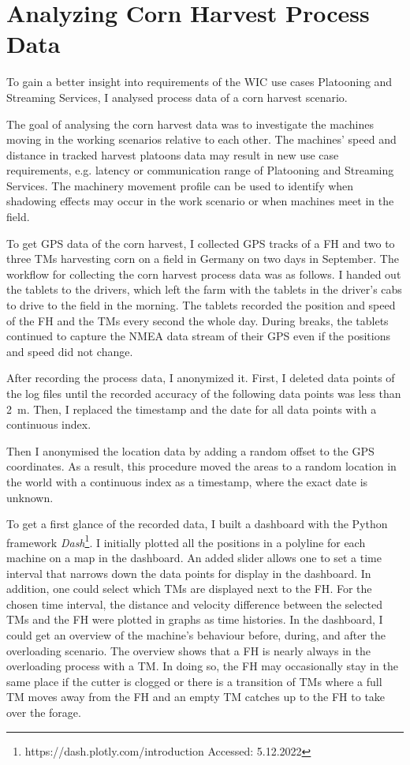 \chapter{Analyzing Corn Harvest Process Data}
\label{chap:cornHarvestData}
To gain a better insight into requirements of the \ac{WIC} use cases Platooning and Streaming Services, I analysed process data of a corn harvest scenario.

The goal of analysing the corn harvest data was to investigate the machines moving in the working scenarios relative to each other.
The machines' speed and distance in tracked harvest platoons data may result in new use case requirements,
e.g. latency or communication range of Platooning and Streaming Services.
The machinery movement profile can be used to identify when shadowing effects may occur in the work scenario or
when machines meet in the field.

To get GPS data of the corn harvest,
I collected GPS tracks of a \ac{FH} and two to three \ac{TM}s harvesting corn on a field in Germany on two days in September.
The workflow for collecting the corn harvest process data was as follows. 
I handed out the tablets to the drivers, which left the farm with the tablets in the driver's cabs to drive to
the field in the morning. The tablets recorded the position and speed of the \ac{FH} and the \ac{TM}s every second the whole day.
During breaks, the tablets continued to capture the NMEA data stream of their GPS even if the positions and speed did not change.

After recording the process data, I anonymized it. 
First, I deleted data points of the log files until the recorded accuracy of the following data points was less than
\SI{2}{\metre}. Then, I replaced the timestamp and the date for all data points with a continuous index.

Then I anonymised the location data by adding a random offset to the GPS coordinates.
As a result, this procedure moved the areas to a random location in the world with a continuous index as a timestamp,
where the exact date is unknown.

To get a first glance of the recorded data, I built a dashboard with the Python framework \textit{Dash}\footnote{https://dash.plotly.com/introduction Accessed: 5.12.2022}.
I initially plotted all the positions in a polyline for each machine
on a map in the dashboard. An added slider allows one to set a time interval that narrows down the data points for
display in the dashboard. In addition, one could select which \ac{TM}s are displayed next to the \ac{FH}.
For the chosen time interval, the distance and velocity difference between the selected \ac{TM}s and the \ac{FH} were
plotted in graphs as time histories.
In the dashboard, I could get an overview of the machine's behaviour
before, during, and after the overloading scenario.
The overview shows that a \ac{FH} is nearly always in the overloading process with a \ac{TM}.
In doing so, the \ac{FH} may occasionally stay in the same place if the cutter is clogged or there is a
transition of \ac{TM}s where a full \ac{TM} moves away from the \ac{FH} and an empty \ac{TM} catches up to the
\ac{FH} to take over the forage.

